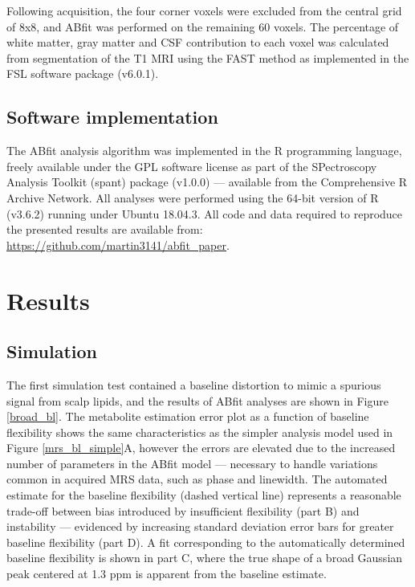 \documentclass[num-refs]{wiley-article}
\begin{document}
Following acquisition, the four corner voxels were excluded from the central grid of 8x8, and ABfit was performed on the remaining 60 voxels. The percentage of white matter, gray matter and CSF contribution to each voxel was calculated from segmentation of the T1 MRI using the FAST method \cite{Zhang2001} as implemented in the FSL software package (v6.0.1).

\subsection{Software implementation}
The ABfit analysis algorithm was implemented in the R \cite{R2019} programming language, freely available under the GPL software license as part of the SPectroscopy Analysis Toolkit (spant) package (v1.0.0) --- available from the Comprehensive R Archive Network. All analyses were performed using the 64-bit version of R (v3.6.2) running under Ubuntu 18.04.3. All code and data required to reproduce the presented results are available from: \url{https://github.com/martin3141/abfit_paper}.

\section{Results}
\subsection{Simulation}
The first simulation test contained a baseline distortion to mimic a spurious signal from scalp lipids, and the results of ABfit analyses are shown in Figure \ref{broad_bl}. The metabolite estimation error plot as a function of baseline flexibility shows the same characteristics as the simpler analysis model used in Figure \ref{mrs_bl_simple}A, however the errors are elevated due to the increased number of parameters in the ABfit model --- necessary to handle variations common in acquired MRS data, such as phase and linewidth. The automated estimate for the baseline flexibility (dashed vertical line) represents a reasonable trade-off between bias introduced by insufficient flexibility (part B) and instability --- evidenced by increasing standard deviation error bars for greater baseline flexibility (part D). A fit corresponding to the automatically determined baseline flexibility is shown in part C, where the true shape of a broad Gaussian peak centered at 1.3 ppm is apparent from the baseline estimate.
\end{document}
